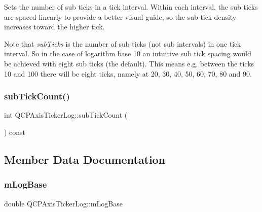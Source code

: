 Sets the number of sub ticks in a tick interval. Within each interval, the sub ticks are spaced linearly to provide a better visual guide, so the sub tick density increases toward the higher tick.

Note that {\itshape sub\+Ticks} is the number of sub ticks (not sub intervals) in one tick interval. So in the case of logarithm base 10 an intuitive sub tick spacing would be achieved with eight sub ticks (the default). This means e.\+g. between the ticks 10 and 100 there will be eight ticks, namely at 20, 30, 40, 50, 60, 70, 80 and 90. \mbox{\label{class_q_c_p_axis_ticker_log_aebe43661977364fc1fd220fa1ae36a10}} 
\subsubsection{\texorpdfstring{sub\+Tick\+Count()}{subTickCount()}}
{\footnotesize\ttfamily int Q\+C\+P\+Axis\+Ticker\+Log\+::sub\+Tick\+Count (\begin{DoxyParamCaption}{ }\end{DoxyParamCaption}) const\hspace{0.3cm}{\ttfamily [inline]}}



\subsection{Member Data Documentation}
\mbox{\label{class_q_c_p_axis_ticker_log_a4108bcc1cd68dcec54dc75667440d328}} 
\subsubsection{\texorpdfstring{m\+Log\+Base}{mLogBase}}
{\footnotesize\ttfamily double Q\+C\+P\+Axis\+Ticker\+Log\+::m\+Log\+Base\hspace{0.3cm}{\ttfamily [protected]}}

\mbox{\label{class_q_c_p_axis_ticker_log_aeba719bbeec39957f475ef89d6ae2fe7}} 
